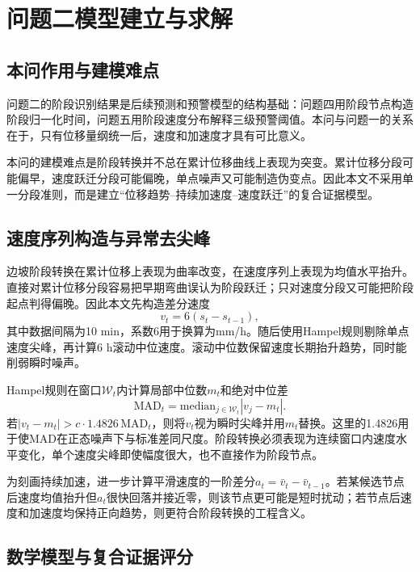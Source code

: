\chapter{问题二模型建立与求解}

\section{本问作用与建模难点}

问题二的阶段识别结果是后续预测和预警模型的结构基础：问题四用阶段节点构造阶段归一化时间，问题五用阶段速度分布解释三级预警阈值。本问与问题一的关系在于，只有位移量纲统一后，速度和加速度才具有可比意义。

本问的建模难点是阶段转换并不总在累计位移曲线上表现为突变。累计位移分段可能偏早，速度跃迁分段可能偏晚，单点噪声又可能制造伪变点。因此本文不采用单一分段准则，而是建立“位移趋势--持续加速度--速度跃迁”的复合证据模型。

\section{速度序列构造与异常去尖峰}

边坡阶段转换在累计位移上表现为曲率改变，在速度序列上表现为均值水平抬升。直接对累计位移分段容易把早期弯曲误认为阶段跃迁；只对速度分段又可能把阶段起点判得偏晚。因此本文先构造差分速度
\begin{equation}
  v_t=6(s_t-s_{t-1}),
\end{equation}
其中数据间隔为10 min，系数6用于换算为mm/h。随后使用Hampel规则剔除单点速度尖峰，再计算6 h滚动中位速度。滚动中位数保留速度长期抬升趋势，同时能削弱瞬时噪声。

Hampel规则在窗口$\mathcal W_t$内计算局部中位数$m_t$和绝对中位差
\begin{equation}
  \mathrm{MAD}_t=\mathrm{median}_{j\in\mathcal W_t}|v_j-m_t|.
\end{equation}
若$|v_t-m_t|>c\cdot1.4826\,\mathrm{MAD}_t$，则将$v_t$视为瞬时尖峰并用$m_t$替换。这里的1.4826用于使MAD在正态噪声下与标准差同尺度。阶段转换必须表现为连续窗口内速度水平变化，单个速度尖峰即使幅度很大，也不直接作为阶段节点。

为刻画持续加速，进一步计算平滑速度的一阶差分$a_t=\bar v_t-\bar v_{t-1}$。若某候选节点后速度均值抬升但$a_t$很快回落并接近零，则该节点更可能是短时扰动；若节点后速度和加速度均保持正向趋势，则更符合阶段转换的工程含义。

\section{数学模型与复合证据评分}

